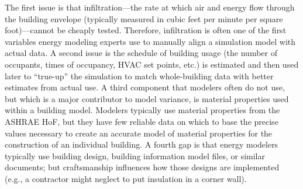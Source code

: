 \documentclass[preprint, review, 12pt]{elsarticle}
\begin{document}
The first issue is that infiltration---the rate at which air and energy flow through the building envelope (typically measured in cubic feet per minute per square foot)---cannot be cheaply tested. %
Therefore, infiltration is often one of the first variables energy modeling experts use to manually align a simulation model with actual data.
A second issue is the schedule of building usage (the number of occupants, times of occupancy, HVAC set points, etc.) %
is estimated and then used later to ``true-up'' the simulation to match whole-building data with better estimates from actual use.
A third component that modelers often do not use, but which is a major contributor to model variance, is material properties used within a building model. Modelers typically use material properties from the ASHRAE HoF, %
but they
have few reliable data on which to base the precise values necessary to create an accurate model of material properties for the construction of an individual building.
A fourth gap is that energy modelers typically use building design, building information model files, or similar documents; but craftsmanship influences how those designs are implemented (e.g., a contractor might neglect to put insulation in a corner wall). %
\end{document}
